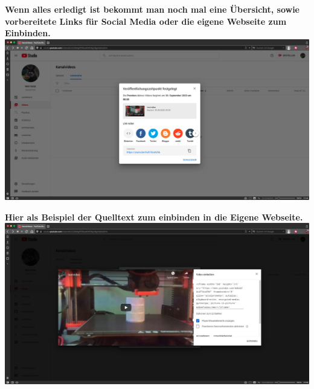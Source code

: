 \newpage
\begin{center}
  \textbf{Wenn alles erledigt ist bekommt man noch mal eine Übersicht, sowie vorbereitete Links für Social Media oder die eigene Webseite zum Einbinden.} \\
  {\vspace{0.3cm}}
  \includegraphics[width=\textwidth]{./pictures/premiere5.png}
\end{center}

\begin{center}
  \textbf{Hier als Beispiel der Quelltext zum einbinden in die Eigene Webseite.} \\
  {\vspace{0.3cm}}
  \includegraphics[width=\textwidth]{./pictures/premiere6.png}
\end{center}

